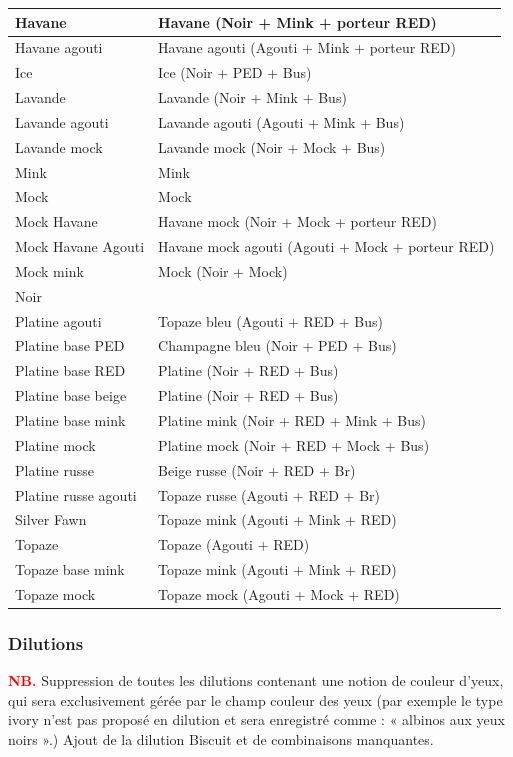 \documentclass[a4paper,10pt]{article}
\newcommand\desire[1]{\noindent\textbf{\textcolor{red}{#1}}}
\begin{document}
\begin{center}
\begin{longtable}{|l|l|}
Havane& Havane (Noir + Mink + porteur RED)\\\hline
Havane agouti& Havane agouti (Agouti + Mink + porteur RED)\\\hline
Ice&  Ice (Noir + PED + Bus)\\\hline
Lavande& Lavande (Noir + Mink + Bus)\\\hline
Lavande agouti& Lavande agouti (Agouti + Mink + Bus)\\\hline
Lavande mock& Lavande mock (Noir + Mock + Bus)\\\hline
Mink& Mink \\\hline
Mock& Mock \\\hline
Mock Havane& Havane mock (Noir + Mock + porteur RED)\\\hline
Mock Havane Agouti& Havane mock agouti (Agouti + Mock + porteur RED)\\\hline
Mock mink& Mock (Noir + Mock)\\\hline
Noir& \\\hline
Platine agouti& Topaze bleu (Agouti + RED + Bus)\\\hline
Platine base PED& Champagne bleu (Noir + PED + Bus)\\\hline
Platine base RED& Platine (Noir + RED + Bus)\\\hline
Platine base beige& Platine (Noir + RED + Bus)\\\hline
Platine base mink& Platine mink (Noir + RED + Mink + Bus)\\\hline
Platine mock& Platine mock (Noir + RED + Mock + Bus)\\\hline
Platine russe& Beige russe (Noir + RED + Br)\\\hline
Platine russe agouti& Topaze russe (Agouti + RED + Br)\\\hline
Silver Fawn& Topaze mink (Agouti + Mink + RED)\\\hline
Topaze& Topaze (Agouti + RED)\\\hline
Topaze base mink& Topaze mink (Agouti + Mink + RED)\\\hline
Topaze mock& Topaze mock (Agouti + Mock + RED)\\\hline
\end{longtable}\end{center}

\subsubsection{Dilutions}
\desire{NB.} Suppression de toutes les dilutions contenant une notion de couleur d’yeux, qui sera exclusivement gérée par le champ couleur des yeux (par exemple le type ivory n'est pas proposé en dilution et sera enregistré comme : « albinos aux yeux noirs ».) Ajout de la dilution Biscuit et de combinaisons manquantes.
\end{document}
